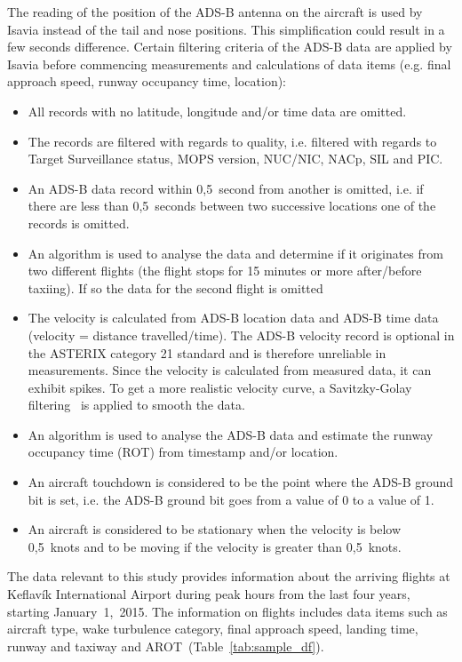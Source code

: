 The reading of the position of the ADS-B antenna on the aircraft is used by Isavia instead of the tail and nose positions. This simplification could result in a few seconds difference. Certain filtering criteria of the ADS-B data are applied by Isavia before commencing measurements and calculations of data items (e.g. final approach speed, runway occupancy time, location):~\cite{isavia_wiki}
\begin{itemize}
    \item All records with no latitude, longitude and/or time data are omitted.
    \item The records are filtered with regards to quality, i.e. filtered with regards to Target Surveillance status, MOPS version, NUC/NIC, NACp, SIL and PIC.
    \item An ADS-B data record within 0,5~second from another is omitted, i.e. if there are less than 0,5~seconds between two successive locations one of the records is omitted.
    \item An algorithm is used to analyse the data and determine if it originates from two different flights (the flight stops for 15 minutes or more after/before taxiing). If so the data for the second flight is omitted
    \item The velocity is calculated from ADS-B location data and ADS-B time data (velocity = distance travelled/time). The ADS-B velocity record is optional in the ASTERIX category 21 standard and is therefore unreliable in measurements. Since the velocity is calculated from measured data, it can exhibit spikes. To get a more realistic velocity curve, a Savitzky-Golay filtering~\cite{Savitzky} is applied to smooth the data.
    \item An algorithm is used to analyse the ADS-B data and estimate the runway occupancy time (ROT) from timestamp and/or location.
    \item An aircraft touchdown is considered to be the point where the ADS-B ground bit is set, i.e. the ADS-B ground bit goes from a value of 0 to a value of 1.
    \item An aircraft is considered to be stationary when the velocity is below 0,5~knots and to be moving if the velocity is greater than 0,5~knots.
    
\end{itemize}

The data relevant to this study provides information about the arriving flights at Keflavík International Airport during peak hours from the last four years, starting January~1,~2015. The information on flights includes data items such as aircraft type, wake turbulence category, final approach speed, landing time, runway and taxiway and AROT~(Table~\ref{tab:sample_df}).

